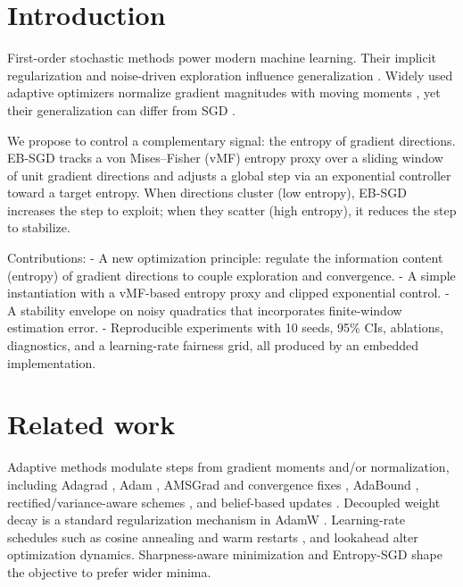\section{Introduction}
First-order stochastic methods power modern machine learning. Their implicit regularization and noise-driven exploration influence generalization \cite{Smith2018BayesianSGDICLR,Keskar2017LargeBatchICLR,Wilson2017MarginalValueNeurIPS}. Widely used adaptive optimizers normalize gradient magnitudes with moving moments \cite{Duchi2011AdagradJMLR,Kingma2015AdamICLR,Reddi2018AdamConvergenceICLR,Luo2019AdaBoundICLR,Liu2020RAdamICLR,Zhuang2020AdaBeliefNeurIPS,Loshchilov2019AdamWICLR}, yet their generalization can differ from SGD \cite{Wilson2017MarginalValueNeurIPS,Foret2021SAMICLR}.

We propose to control a complementary signal: the entropy of gradient directions. EB-SGD tracks a von Mises--Fisher (vMF) entropy proxy over a sliding window of unit gradient directions and adjusts a global step via an exponential controller toward a target entropy. When directions cluster (low entropy), EB-SGD increases the step to exploit; when they scatter (high entropy), it reduces the step to stabilize.

Contributions:
- A new optimization principle: regulate the information content (entropy) of gradient directions to couple exploration and convergence.
- A simple instantiation with a vMF-based entropy proxy and clipped exponential control.
- A stability envelope on noisy quadratics that incorporates finite-window estimation error.
- Reproducible experiments with 10 seeds, 95\% CIs, ablations, diagnostics, and a learning-rate fairness grid, all produced by an embedded implementation.

\section{Related work}
Adaptive methods modulate steps from gradient moments and/or normalization, including Adagrad \cite{Duchi2011AdagradJMLR}, Adam \cite{Kingma2015AdamICLR}, AMSGrad and convergence fixes \cite{Reddi2018AdamConvergenceICLR}, AdaBound \cite{Luo2019AdaBoundICLR}, rectified/variance-aware schemes \cite{Liu2020RAdamICLR}, and belief-based updates \cite{Zhuang2020AdaBeliefNeurIPS}. Decoupled weight decay is a standard regularization mechanism in AdamW \cite{Loshchilov2019AdamWICLR}. Learning-rate schedules such as cosine annealing and warm restarts \cite{Loshchilov2017SGDRICLR}, and lookahead \cite{Zhang2019LookaheadNeurIPS} alter optimization dynamics. Sharpness-aware minimization \cite{Foret2021SAMICLR} and Entropy-SGD \cite{Chaudhari2019EntropySGDJSTAT} shape the objective to prefer wider minima.

